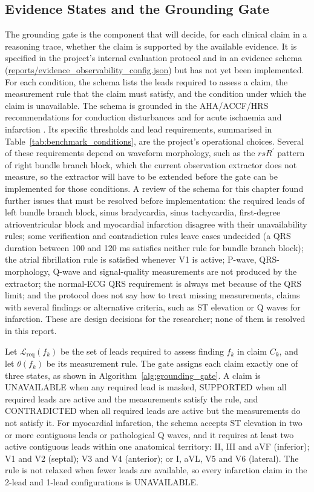 \subsection{Evidence States and the Grounding Gate}
The grounding gate is the component that will decide, for each clinical claim in a reasoning trace, whether the claim is supported by the available evidence. It is specified in the project's internal evaluation protocol and in an evidence schema (\url{reports/evidence_observability_config.json}) but has not yet been implemented. For each condition, the schema lists the leads required to assess a claim, the measurement rule that the claim must satisfy, and the condition under which the claim is unavailable. The schema is grounded in the AHA/ACCF/HRS recommendations for conduction disturbances and for acute ischaemia and infarction \cite{SURAWICZ2009AHA,WAGNER2009AHA}. Its specific thresholds and lead requirements, summarised in Table~\ref{tab:benchmark_conditions}, are the project's operational choices. Several of these requirements depend on waveform morphology, such as the $rsR^\prime$ pattern of right bundle branch block, which the current observation extractor does not measure, so the extractor will have to be extended before the gate can be implemented for those conditions. A review of the schema for this chapter found further issues that must be resolved before implementation: the required leads of left bundle branch block, sinus bradycardia, sinus tachycardia, first-degree atrioventricular block and myocardial infarction disagree with their unavailability rules; some verification and contradiction rules leave cases undecided (a QRS duration between 100 and 120 ms satisfies neither rule for bundle branch block); the atrial fibrillation rule is satisfied whenever V1 is active; P-wave, QRS-morphology, Q-wave and signal-quality measurements are not produced by the extractor; the normal-ECG QRS requirement is always met because of the QRS limit; and the protocol does not say how to treat missing measurements, claims with several findings or alternative criteria, such as ST elevation or Q waves for infarction. These are design decisions for the researcher; none of them is resolved in this report.

Let $\mathcal{L}_{\text{req}}(f_k)$ be the set of leads required to assess finding $f_k$ in claim $C_k$, and let $\theta(f_k)$ be its measurement rule. The gate assigns each claim exactly one of three states, as shown in Algorithm~\ref{alg:grounding_gate}. A claim is UNAVAILABLE when any required lead is masked, SUPPORTED when all required leads are active and the measurements satisfy the rule, and CONTRADICTED when all required leads are active but the measurements do not satisfy it. For myocardial infarction, the schema accepts ST elevation in two or more contiguous leads or pathological Q waves, and it requires at least two active contiguous leads within one anatomical territory: II, III and aVF (inferior); V1 and V2 (septal); V3 and V4 (anterior); or I, aVL, V5 and V6 (lateral). The rule is not relaxed when fewer leads are available, so every infarction claim in the 2-lead and 1-lead configurations is UNAVAILABLE.

